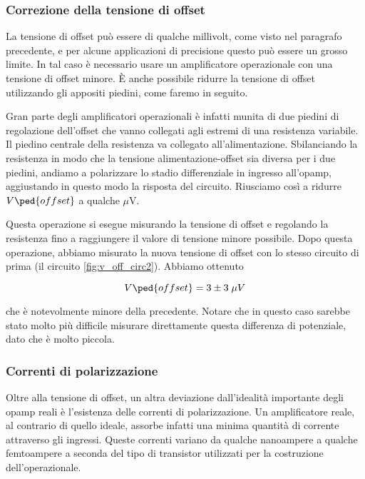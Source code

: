 \subsubsection{Correzione della tensione di offset}

La tensione di offset può essere di qualche millivolt, come visto nel paragrafo precedente,
e per alcune applicazioni di precisione questo può essere un grosso limite.
In tal caso è necessario usare un amplificatore operazionale con una tensione di offset minore.
È anche possibile ridurre la tensione di offset utilizzando gli appositi piedini, come faremo in seguito.

Gran parte degli amplificatori operazionali è infatti munita di due piedini di regolazione dell'offset
che vanno collegati agli estremi di una resistenza variabile. Il piedino centrale della resistenza
va collegato all'alimentazione. Sbilanciando la resistenza in modo che la tensione alimentazione-offset
sia diversa per i due piedini, andiamo a polarizzare lo stadio differenziale in ingresso all'opamp,
aggiustando in questo modo la risposta del circuito. Riusciamo così a ridurre $V\ped{offset}$ a qualche
$\mu$\si{\volt}.

Questa operazione si esegue misurando la tensione di offset e regolando la resistenza fino a raggiungere
il valore di tensione minore possibile.
Dopo questa operazione, abbiamo misurato la nuova tensione di offset con lo stesso circuito
di prima (il circuito \ref{fig:v_off_circ2}). Abbiamo ottenuto

\begin{equation}
    V\ped{offset} = 3 \pm 3 \; \mu V
\end{equation}

che è notevolmente minore della precedente. Notare che in questo caso sarebbe stato molto più
difficile misurare direttamente questa differenza di potenziale, dato che è molto piccola.

\subsubsection{Correnti di polarizzazione}

Oltre alla tensione di offset, un altra deviazione dall'idealità importante degli opamp reali è l'esistenza
delle correnti di polarizzazione. Un amplificatore reale, al contrario di quello ideale, assorbe infatti una
minima quantità di corrente attraverso gli ingressi. Queste correnti variano da qualche nanoampere a qualche
femtoampere a seconda del tipo di transistor utilizzati per la costruzione dell'operazionale.

